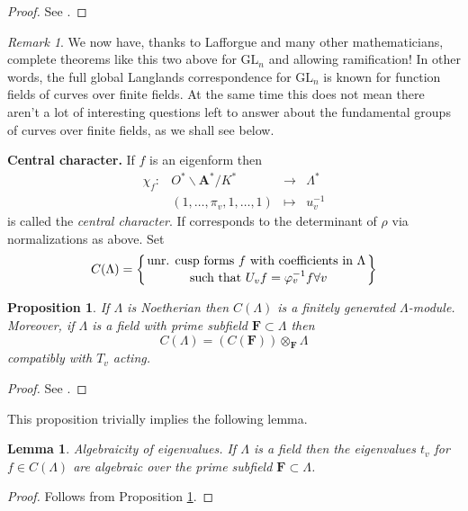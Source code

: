 \documentclass{stacks-project}
\theoremstyle{plain}
\newtheorem{proposition}[subsection]{Proposition}
\newtheorem{lemma}[subsection]{Lemma}
\theoremstyle{definition}
\theoremstyle{remark}
\newtheorem{remark}[subsection]{Remark}
\numberwithin{equation}{subsection}
\begin{document}
\begin{proof}
See \cite{D1}.
\end{proof}

\begin{remark}
\label{remark-lafforgue}
We now have, thanks to Lafforgue and many other mathematicians,
complete theorems like this two above for $\text{GL}_n$
and allowing ramification!
In other words, the full global Langlands correspondence for $\text{GL}_n$
is known for function fields of curves over finite fields. At the same
time this does not mean there aren't a lot of interesting questions left
to answer about the fundamental groups of curves over finite fields, as
we shall see below.
\end{remark}

\noindent
{\bf Central character.} If $f$ is an eigenform then
$$
\begin{matrix}
\chi_f : &
O^*\backslash \mathbf{A}^*/K^* &
\to &
\Lambda^* \\
&
(1, \ldots, \pi_v, 1, \ldots, 1) &
\mapsto &
u_v^{-1}
\end{matrix}
$$
is called the {\it central character}. If corresponds to the
determinant of $\rho$ via normalizations as above. Set
$$
C(\Lambda) =
\left\{
{\text{unr. cusp forms } f \text{ with coefficients in }\Lambda}
\atop {\text{ such that } U_v f = \varphi_v^{-1}f\forall v}
\right\}
$$

\begin{proposition}
\label{proposition-cusp-forms-finite}
If $\Lambda$ is Noetherian then $C(\Lambda)$ is a
finitely generated $\Lambda$-module. Moreover, if $\Lambda$ is a field with
prime subfield $\mathbf{F} \subset \Lambda$ then
$$
C(\Lambda)=(C(\mathbf{F}))\otimes_{\mathbf{F}}\Lambda
$$
compatibly with $T_v$ acting.
\end{proposition}

\begin{proof}
See \cite[Proposition 4.7]{dJ-conjecture}.
\end{proof}

\noindent
This proposition trivially implies the following lemma.

\begin{lemma}
\label{lemma-eigenvalues-algebraic}
Algebraicity of eigenvalues.
If $\Lambda$ is a field then the eigenvalues $t_v$ for $f\in
C(\Lambda)$ are algebraic over the prime subfield
$\mathbf{F} \subset \Lambda$.
\end{lemma}

\begin{proof}
Follows from Proposition \ref{proposition-cusp-forms-finite}.
\end{proof}
\end{document}
